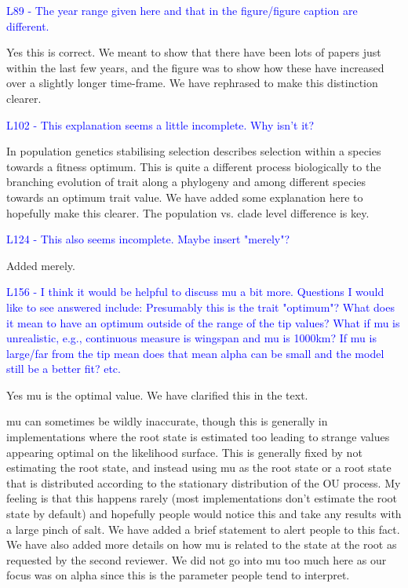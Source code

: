 \documentclass[12pt]{letter}
\begin{document}
\begin{letter}{}
\textcolor{blue}{L89 - The year range given here and that in the figure/figure caption are different.}

Yes this is correct. We meant to show that there have been lots of papers just within the last few years, and the figure was to show how these have increased over a slightly longer time-frame. We have rephrased to make this distinction clearer.

\textcolor{blue}{L102 - This explanation seems a little incomplete. Why isn't it?}

In population genetics stabilising selection describes selection within a species towards a fitness optimum. This is quite a different process biologically to the branching evolution of trait along a phylogeny and among different species towards an optimum trait value. We have added some explanation here to hopefully make this clearer. The population vs. clade level difference is key.

\textcolor{blue}{L124 - This also seems incomplete. Maybe insert "merely"?}

Added merely.

\textcolor{blue}{L156 - I think it would be helpful to discuss mu a bit more. Questions I would like to see answered include: Presumably this is the trait "optimum"? What does it mean to have an optimum outside of the range of the tip values? What if mu is unrealistic, e.g., continuous measure is wingspan and mu is 1000km? If mu is large/far from the tip mean does that mean alpha can be small and the model still be a better fit? etc.}

Yes mu is the optimal value. We have clarified this in the text. 

mu can sometimes be wildly inaccurate, though this is generally in implementations where the root state is estimated too leading to strange values appearing optimal on the likelihood surface. This is generally fixed by not estimating the root state, and instead using mu as the root state or a root state that is distributed according to the stationary distribution of the OU process. My feeling is that this happens rarely (most implementations don't estimate the root state by default) and hopefully people would notice this and take any results with a large pinch of salt. We have added a brief statement to alert people to this fact. We have also added more details on how mu is related to the state at the root as requested by the second reviewer. We did not go into mu too much here as our focus was on alpha since this is the parameter people tend to interpret.


\end{letter}
\end{document}
